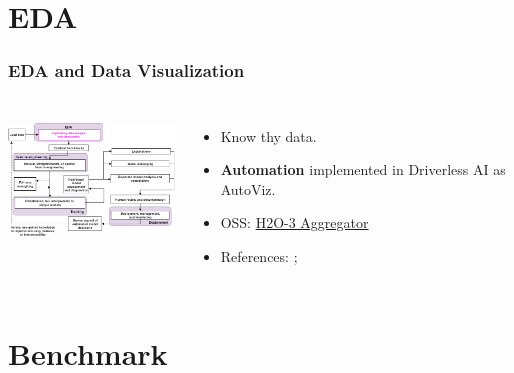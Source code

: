 \documentclass[11pt,
               aspectratio=169,
               hyperref={colorlinks}
               ]{beamer}
\begin{document}
	\section{EDA}
	
		\begin{frame}
		
			\frametitle{EDA and Data Visualization}		
			
			\begin{columns}
	
				\centering
				\includegraphics[height=100pt]{img/eda.png}
				
				\vspace{-5pt}
				\begin{itemize}
					\item Know thy data.
					\item \textbf{Automation} implemented in Driverless AI as AutoViz.
					\item OSS: \href{http://docs.h2o.ai/h2o/latest-stable/h2o-docs/data-science/aggregator.html}{H2O-3 Aggregator}
					\item References: ; 
				\end{itemize}
				
			\end{columns}
		
		\end{frame}

	\section{Benchmark}
	
\end{document}
